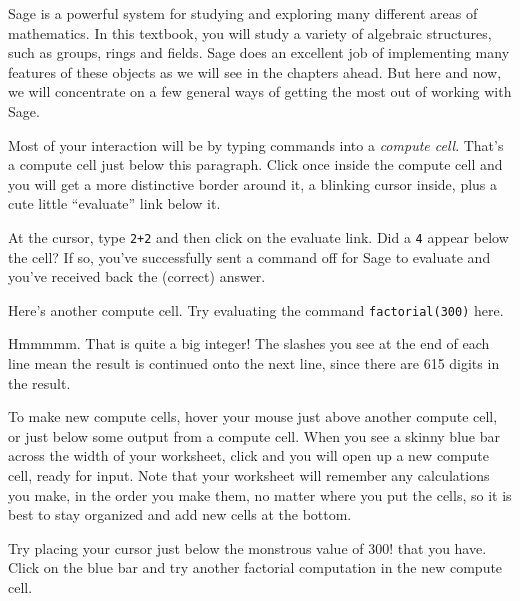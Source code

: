 Sage is a powerful system for studying and exploring many different areas of mathematics.  In this textbook, you will study a variety of algebraic structures, such as groups, rings and fields.  Sage does an excellent job of implementing many features of these objects as we will see in the chapters ahead.  But here and now, we will concentrate on a few general ways of getting the most out of working with Sage.\par
%
%
Most of your interaction will be by typing commands into a \emph{compute cell}.  That's a compute cell just below this paragraph.  Click once inside the compute cell and you will get a more distinctive border around it, a blinking cursor inside, plus a cute little ``evaluate'' link below it.\par
%
\begin{sageverbatim}

\end{sageverbatim}
%
At the cursor, type \verb?2+2? and then click on the evaluate link.  Did a \verb?4? appear below the cell?  If so, you've successfully sent a command off for Sage to evaluate and you've received back the (correct) answer.\par
%
Here's another compute cell.  Try evaluating the command \verb?factorial(300)? here.
%
\begin{sageverbatim}

\end{sageverbatim}
%
Hmmmmm.  That is quite a big integer!  The slashes you see at the end of each line mean the result is continued onto the next line, since there are 615 digits in the result.\par
%
To make new compute cells, hover your mouse just above another compute cell, or just below some output from a compute cell.  When you see a skinny blue bar across the width of your worksheet, click and you will open up a new compute cell, ready for input.  Note that your worksheet will remember any calculations you make, in the order you make them, no matter where you put the cells, so it is best to stay organized and add new cells at the bottom.\par
%
Try placing your cursor just below the monstrous value of $300!$ that you have.  Click on the blue bar and try another factorial computation in the new compute cell.\par

